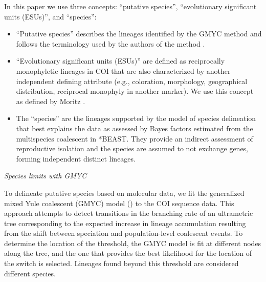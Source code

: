 \documentclass[12pt,letterpaper]{article}\usepackage[]{graphicx}\usepackage[]{color}
\renewcommand{\subsection}[1]{%
\bigskip
\begin{center}
\begin{large}
\normalfont\itshape #1
\end{large}
\end{center}}
\begin{document}
In this paper we use three concepts: ``putative species'', ``evolutionary
significant units (ESUs)'', and ``species'':

\begin{itemize}
\item ``Putative species'' describes the lineages identified by the GMYC method
  and follows the terminology used by the authors of the method \citep{Pons2006,
    Monaghan2009}.
\item ``Evolutionary significant units (ESUs)'' are defined as reciprocally
  monophyletic lineages in COI that are also characterized by another
  independent defining attribute (e.g., coloration, morphology, geographical
  distribution, reciprocal monophyly in another marker). We use this concept
  as defined by Moritz \citep{Moritz1994}.
\item The ``species'' are the lineages supported by the model of species
  delineation that best explains the data as assessed by Bayes factors estimated
  from the multispecies coalescent in *BEAST. They provide an indirect
  assessment of reproductive isolation and the species are assumed to not
  exchange genes, forming independent distinct lineages.
\end{itemize}

\subsection{Species limits with GMYC}

To delineate putative species based on molecular data, we fit the generalized
mixed Yule coalescent (GMYC) model (\citep{Pons2006,Monaghan2009,Fujisawa2013})
to the COI sequence data. This approach attempts to detect transitions in the
branching rate of an ultrametric tree corresponding to the expected increase in
lineage accumulation resulting from the shift between speciation and
population-level coalescent events. To determine the location of the threshold,
the GMYC model is fit at different nodes along the tree, and the one that
provides the best likelihood for the location of the switch is
selected. Lineages found beyond this threshold are considered different species.
\end{document}
